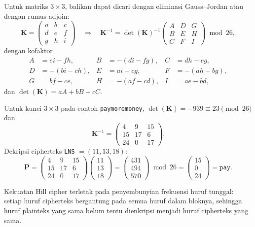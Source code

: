 Untuk matriks $3 \times 3$, balikan dapat dicari dengan eliminasi Gauss--Jordan atau dengan rumus adjoin:
\[
\mathbf{K} = \begin{pmatrix} a & b & c \\ d & e & f \\ g & h & i \end{pmatrix}
\quad \Rightarrow \quad
\mathbf{K}^{-1} = \det(\mathbf{K})^{-1} \begin{pmatrix} A & D & G \\ B & E & H \\ C & F & I \end{pmatrix} \bmod 26,
\]
dengan kofaktor
\begin{align*}
A &= ei - fh, & B &= -(di - fg), & C &= dh - eg, \\
D &= -(bi - ch), & E &= ai - cg, & F &= -(ah - bg), \\
G &= bf - ce, & H &= -(af - cd), & I &= ae - bd,
\end{align*}
dan $\det(\mathbf{K}) = aA + bB + cC$.

\begin{contoh}
Untuk kunci $3 \times 3$ pada contoh \texttt{paymoremoney}, $\det(\mathbf{K}) = -939 \equiv 23 \pmod{26}$ dan
\[
\mathbf{K}^{-1} = \begin{pmatrix} 4 & 9 & 15 \\ 15 & 17 & 6 \\ 24 & 0 & 17 \end{pmatrix}.
\]
Dekripsi cipherteks \texttt{LNS} $= (11, 13, 18)$:
\[
\mathbf{P} = \begin{pmatrix} 4 & 9 & 15 \\ 15 & 17 & 6 \\ 24 & 0 & 17 \end{pmatrix}
\begin{pmatrix} 11 \\ 13 \\ 18 \end{pmatrix}
= \begin{pmatrix} 431 \\ 494 \\ 570 \end{pmatrix} \bmod 26
= \begin{pmatrix} 15 \\ 0 \\ 24 \end{pmatrix} = \texttt{pay}.
\]
\end{contoh}

Kekuatan Hill cipher terletak pada penyembunyian frekuensi huruf tunggal: setiap huruf cipherteks bergantung pada semua huruf dalam bloknya, sehingga huruf plainteks yang sama belum tentu dienkripsi menjadi huruf cipherteks yang sama.

